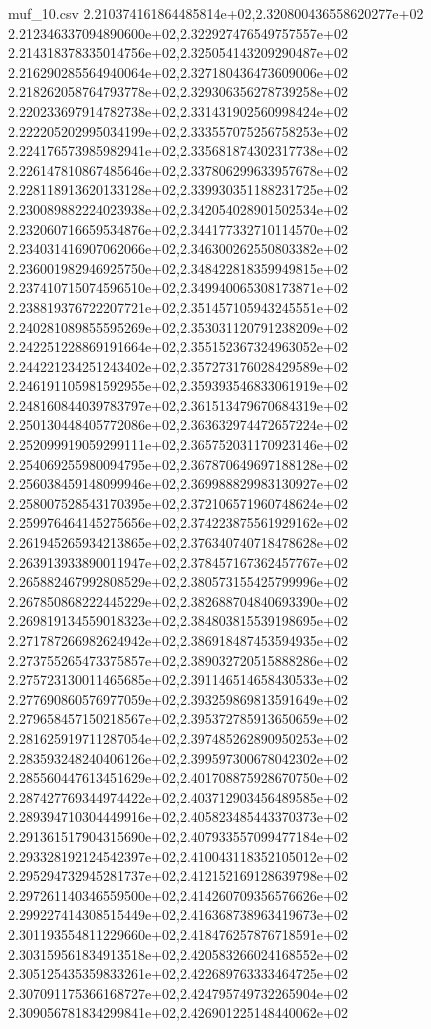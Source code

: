 \begin{filecontents*}{muf_10.csv}
2.210374161864485814e+02,2.320800436558620277e+02
2.212346337094890600e+02,2.322927476549757557e+02
2.214318378335014756e+02,2.325054143209290487e+02
2.216290285564940064e+02,2.327180436473609006e+02
2.218262058764793778e+02,2.329306356278739258e+02
2.220233697914782738e+02,2.331431902560998424e+02
2.222205202995034199e+02,2.333557075256758253e+02
2.224176573985982941e+02,2.335681874302317738e+02
2.226147810867485646e+02,2.337806299633957678e+02
2.228118913620133128e+02,2.339930351188231725e+02
2.230089882224023938e+02,2.342054028901502534e+02
2.232060716659534876e+02,2.344177332710114570e+02
2.234031416907062066e+02,2.346300262550803382e+02
2.236001982946925750e+02,2.348422818359949815e+02
2.237410715074596510e+02,2.349940065308173871e+02
2.238819376722207721e+02,2.351457105943245551e+02
2.240281089855595269e+02,2.353031120791238209e+02
2.242251228869191664e+02,2.355152367324963052e+02
2.244221234251243402e+02,2.357273176028429589e+02
2.246191105981592955e+02,2.359393546833061919e+02
2.248160844039783797e+02,2.361513479670684319e+02
2.250130448405772086e+02,2.363632974472657224e+02
2.252099919059299111e+02,2.365752031170923146e+02
2.254069255980094795e+02,2.367870649697188128e+02
2.256038459148099946e+02,2.369988829983130927e+02
2.258007528543170395e+02,2.372106571960748624e+02
2.259976464145275656e+02,2.374223875561929162e+02
2.261945265934213865e+02,2.376340740718478628e+02
2.263913933890011947e+02,2.378457167362457767e+02
2.265882467992808529e+02,2.380573155425799996e+02
2.267850868222445229e+02,2.382688704840693390e+02
2.269819134559018323e+02,2.384803815539198695e+02
2.271787266982624942e+02,2.386918487453594935e+02
2.273755265473375857e+02,2.389032720515888286e+02
2.275723130011465685e+02,2.391146514658430533e+02
2.277690860576977059e+02,2.393259869813591649e+02
2.279658457150218567e+02,2.395372785913650659e+02
2.281625919711287054e+02,2.397485262890950253e+02
2.283593248240406126e+02,2.399597300678042302e+02
2.285560447613451629e+02,2.401708875928670750e+02
2.287427769344974422e+02,2.403712903456489585e+02
2.289394710304449916e+02,2.405823485443370373e+02
2.291361517904315690e+02,2.407933557099477184e+02
2.293328192124542397e+02,2.410043118352105012e+02
2.295294732945281737e+02,2.412152169128639798e+02
2.297261140346559500e+02,2.414260709356576626e+02
2.299227414308515449e+02,2.416368738963419673e+02
2.301193554811229660e+02,2.418476257876718591e+02
2.303159561834913518e+02,2.420583266024168552e+02
2.305125435359833261e+02,2.422689763333464725e+02
2.307091175366168727e+02,2.424795749732265904e+02
2.309056781834299841e+02,2.426901225148440062e+02

\end{filecontents*}

